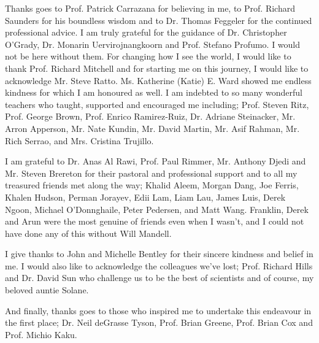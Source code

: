 \begin{acknowledgements}
Thanks goes to Prof. Patrick Carrazana for believing in me, to Prof. Richard Saunders for his boundless wisdom and to Dr. Thomas Feggeler for the continued professional advice. I am truly grateful for the guidance of Dr. Christopher O’Grady, Dr. Monarin Uervirojnangkoorn and Prof. Stefano Profumo. I would not be here without them. For changing how I see the world, I would like to thank Prof. Richard Mitchell and for starting me on this journey, I would like to acknowledge Mr. Steve Ratto. Ms. Katherine (Katie) E. Ward showed me endless kindness for which I am honoured as well. I am indebted to so many wonderful teachers who taught, supported and encouraged me including; Prof. Steven Ritz, Prof. George Brown, Prof. Enrico Ramirez‑Ruiz, Dr. Adriane Steinacker, Mr. Arron Apperson, Mr. Nate Kundin, Mr. David Martin, Mr. Asif Rahman, Mr. Rich Serrao, and Mrs. Cristina Trujillo.

I am grateful to Dr. Anas Al Rawi, Prof. Paul Rimmer, Mr. Anthony Djedi and Mr. Steven Brereton for their pastoral and professional support and to all my treasured friends met along the way; Khalid Aleem, Morgan Dang, Joe Ferris, Khalen Hudson, Perman Jorayev, Edii Lam, Liam Lau, James Luis, Derek Ngoon, Michael O'Donnghaile, Peter Pedersen, and Matt Wang. Franklin, Derek and Arun were the most genuine of friends even when I wasn’t, and I could not have done any of this without Will Mandell.

I give thanks to John and Michelle Bentley for their sincere kindness and belief in me. I would also like to acknowledge the colleagues we’ve lost; Prof. Richard Hills and Dr. David Sun who challenge us to be the best of scientists and of course, my beloved auntie Solane.

And finally, thanks goes to those who inspired me to undertake this endeavour in the first place; Dr. Neil deGrasse Tyson, Prof. Brian Greene, Prof. Brian Cox and Prof. Michio Kaku.

\end{acknowledgements}
